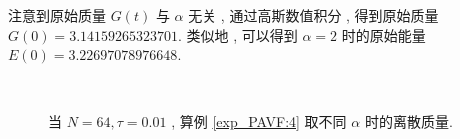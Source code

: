 	注意到原始质量 $G(t)$ 与 $\alpha$ 无关 , 通过高斯数值积分 , 得到原始质量 $G(0)=3.14159265323701$.
	类似地 , 可以得到 $\alpha=2$ 时的原始能量 $E(0)=3.22697078976648$.

\begin{figure}[H]
	\begin{center}
	 \\
	\caption{当  $N = 64 , \tau=0.01$ , 算例 \ref{exp_PAVF:4} 取不同 $\alpha$ 时的离散质量.}
	\label{fig_PAVF:9}
	\end{center}
	\end{figure}

